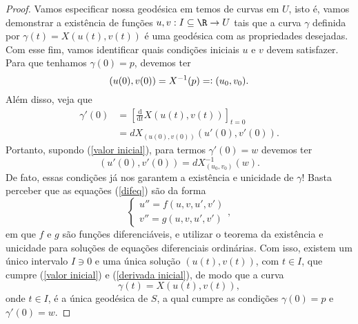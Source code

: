\begin{proof}
    Vamos especificar nossa geodésica em temos de curvas em \( U \), isto é, vamos demonstrar a existência de funções \( u, v : I \subseteq \R \to U \) tais que a curva \( \gamma \) definida por \( \gamma ( t ) = X ( u ( t ), v ( t ) ) \) é uma geodésica com as propriedades desejadas.
    Com esse fim, vamos identificar quais condições iniciais \( u \) e \( v \) devem satisfazer.
    Para que tenhamos \( \gamma ( 0 ) = p \), devemos ter
    \begin{equation}
        ( u ( 0 ), v ( 0 ) ) = X^{ -1 } ( p ) = \vcentcolon ( u_{ 0 }, v_{ 0 } )
        \label{valor inicial}
    .\end{equation}
    Além disso, veja que
    \begin{align*}
        \gamma' ( 0 )
        &= \left[
            \frac{ \mathrm d }{ \mathrm d t } X ( u ( t ), v ( t ) )  
        \right]_{ t = 0 } \\
        &= dX_{ ( u ( 0 ), v ( 0 ) ) } ( u' ( 0 ), v' ( 0 ) )
    .\end{align*}
    Portanto, supondo (\ref{valor inicial}), para termos \( \gamma' ( 0 ) = w \) devemos ter
    \begin{equation}
        ( u' ( 0 ), v' ( 0 ) ) = dX_{ ( u_{ 0 }, v_{ 0 } ) }^{ -1 } ( w )
        \label{derivada inicial}
    .\end{equation}
    De fato, essas condições já nos garantem a existência e unicidade de \( \gamma \)!
    Basta perceber que as equações (\ref{difeq}) são da forma
    \begin{equation*}
        \begin{cases}
            u'' = f ( u, v, u', v' ) \\
            v'' = g ( u, v, u', v' )
        \end{cases}
    ,\end{equation*}
    em que \( f \) e \( g \) são funções diferenciáveis, e utilizar o teorema da existência e unicidade para soluções de equações diferenciais ordinárias.
    Com isso, existem um único intervalo \( I \ni 0 \) e uma única solução \( ( u ( t ), v ( t ) ) \), com \( t \in I \), que cumpre (\ref{valor inicial}) e (\ref{derivada inicial}), de modo que a curva
    \begin{equation*}
        \gamma ( t ) = X ( u ( t ), v ( t ) )
    ,\end{equation*}
    onde \( t \in I \), é a única geodésica de \( S \), a qual cumpre as condições \( \gamma ( 0 ) = p \) e \( \gamma' ( 0 ) = w \).
\end{proof}

